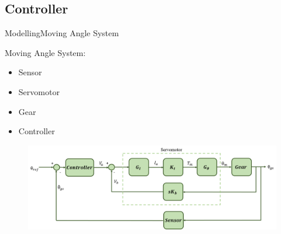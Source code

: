 \subsection{Controller}
%
%
%
%  
%
%
%
%

\begin{frame}{Modelling}{Moving Angle System}
  \begin{block}{Moving Angle System:}

	  \begin{itemize}
	  	\item Sensor
	  	\item Servomotor
	  	\item Gear
	  	\item Controller
	  \end{itemize}

	  \begin{figure}
        \includegraphics[scale=0.26]{../report/figures/servo+gear+noise.png}
      \end{figure}
  
  \end{block}
\end{frame}

